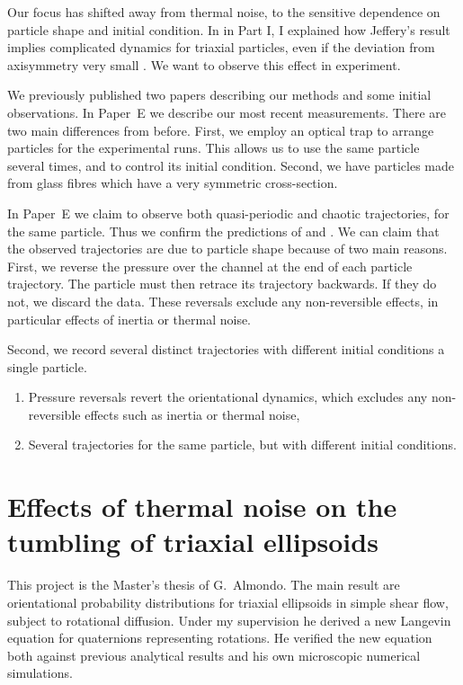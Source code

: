 \documentclass[thesis.tex]{subfiles}
\begin{document}
Our focus has shifted away from thermal noise, to the sensitive dependence on particle shape and initial condition. In  in Part I, I explained how Jeffery's result implies complicated dynamics for triaxial particles, even if the deviation from axisymmetry very small \cite{hinch1979,yarin1997}. We want to observe this effect in experiment.

We previously published two papers \cite{mishra2012,einarsson2013} describing our methods and some initial observations. In Paper~E we describe our most recent measurements. There are two main differences from before. First, we employ an optical trap to arrange particles for the experimental runs. This allows us to use the same particle several times, and to control its initial condition. Second, we have particles made from glass fibres which have a very symmetric cross-section.

In Paper~E we claim to observe both quasi-periodic and chaotic trajectories, for the same particle. Thus we confirm the predictions of \citet{hinch1979} and \citet{yarin1997}. We can claim that the observed trajectories are due to particle shape because of two main reasons. First, we reverse the pressure over the channel at the end of each particle trajectory. The particle must then retrace its trajectory backwards. If they do not, we discard the data. These reversals exclude any non-reversible effects, in particular effects of inertia or thermal noise.

Second, we record several distinct trajectories with different initial conditions a single particle.
\begin{enumerate}
    \item Pressure reversals revert the orientational dynamics, which excludes any non-reversible effects such as inertia or thermal noise,
    \item Several trajectories for the same particle, but with different initial conditions.
\end{enumerate}

\chapter{Effects of thermal noise on the tumbling of triaxial ellipsoids}
This project is the Master's thesis of G.~Almondo. The main result are orientational probability distributions for triaxial ellipsoids in simple shear flow, subject to rotational diffusion. Under my supervision he derived a new Langevin equation for quaternions representing rotations. He verified the new equation both against previous analytical results \cite{rallison,brenner} and his own microscopic numerical simulations.
\end{document}
